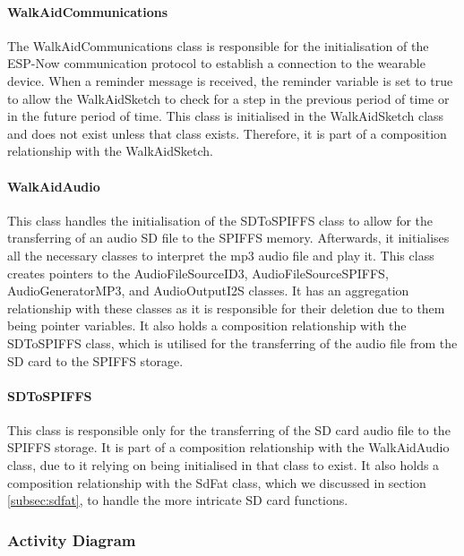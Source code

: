                 \paragraph{WalkAidCommunications}\mbox{}

                    The WalkAidCommunications class is responsible for the initialisation of the ESP-Now communication protocol to establish a connection to the wearable device. When a reminder message is received, the reminder variable is set to true to allow the WalkAidSketch to check for a step in the previous period of time or in the future period of time. This class is initialised in the WalkAidSketch class and does not exist unless that class exists. Therefore, it is part of a composition relationship with the WalkAidSketch.

                \paragraph{WalkAidAudio}\mbox{}

                    This class handles the initialisation of the SDToSPIFFS class to allow for the transferring of an audio SD file to the SPIFFS memory. Afterwards, it initialises all the necessary classes to interpret the mp3 audio file and play it. This class creates pointers to the AudioFileSourceID3, AudioFileSourceSPIFFS, AudioGeneratorMP3, and AudioOutputI2S classes. It has an aggregation relationship with these classes as it is responsible for their deletion due to them being pointer variables. It also holds a composition relationship with the SDToSPIFFS class, which is utilised for the transferring of the audio file from the SD card to the SPIFFS storage. 

                \paragraph{SDToSPIFFS}\mbox{}

                    This class is responsible only for the transferring of the SD card audio file to the SPIFFS storage. It is part of a composition relationship with the WalkAidAudio class, due to it relying on being initialised in that class to exist. It also holds a composition relationship with the SdFat class, which we discussed in section \ref{subsec:sdfat}, to handle the more intricate SD card functions. 
                
                \newpage

            \subsubsection{Activity Diagram}
            \label{subsubsec:walking_aid_activity}

